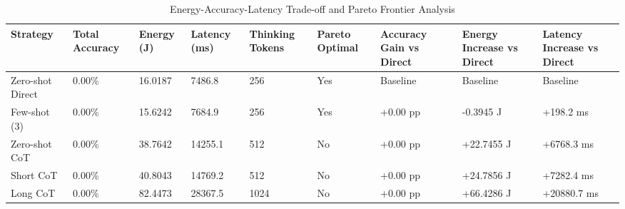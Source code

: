 \begin{table}
\caption{Energy-Accuracy-Latency Trade-off and Pareto Frontier Analysis}
\label{tab:tradeoff_comparison}
\begin{tabular}{lllllllll}
\toprule
Strategy & Total Accuracy & Energy (J) & Latency (ms) & Thinking Tokens & Pareto Optimal & Accuracy Gain vs Direct & Energy Increase vs Direct & Latency Increase vs Direct \\
\midrule
Zero-shot Direct & 0.00\% & 16.0187 & 7486.8 & 256 & Yes & Baseline & Baseline & Baseline \\
Few-shot (3) & 0.00\% & 15.6242 & 7684.9 & 256 & Yes & +0.00 pp & -0.3945 J & +198.2 ms \\
Zero-shot CoT & 0.00\% & 38.7642 & 14255.1 & 512 & No & +0.00 pp & +22.7455 J & +6768.3 ms \\
Short CoT & 0.00\% & 40.8043 & 14769.2 & 512 & No & +0.00 pp & +24.7856 J & +7282.4 ms \\
Long CoT & 0.00\% & 82.4473 & 28367.5 & 1024 & No & +0.00 pp & +66.4286 J & +20880.7 ms \\
\bottomrule
\end{tabular}
\end{table}
